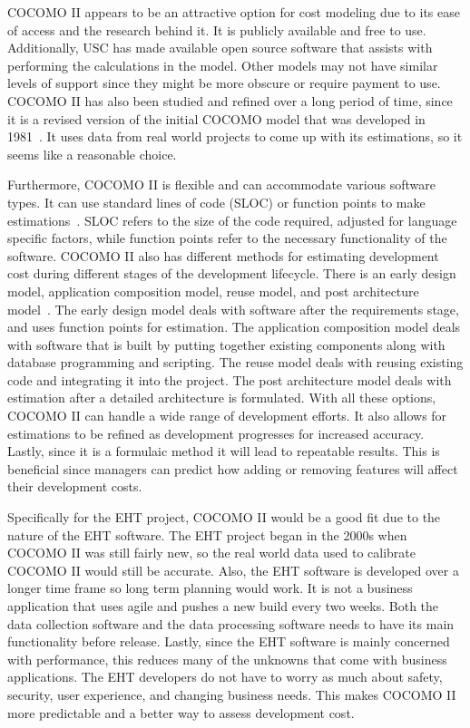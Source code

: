 \documentclass[letterpaper,twocolumn,10pt]{article}
\begin{document}
COCOMO II appears to be an attractive option for cost modeling due to its ease of access and the research behind it. It is publicly
available and free to use. Additionally, USC has made available open source software that assists with performing the calculations in the model.
Other models may not have similar levels of support since they might be more obscure or require payment to use.
COCOMO II has also been studied and refined over a long period of time, since it is a revised version of the initial COCOMO model that was
developed in 1981~\cite{COCOMO}. It uses data from real world projects to come up with its estimations, so it seems like a reasonable choice.

Furthermore, COCOMO II is flexible and can accommodate various software types. It can use standard lines of code (SLOC) or function points
to make estimations~\cite{COCOMO}. SLOC refers to the size of the code required, adjusted for language specific factors, while function points
refer to the necessary functionality of the software. COCOMO II also has different methods for estimating development cost
during different stages of the development lifecycle. There is an early design model, application composition model, reuse model, and post
architecture model~\cite{Sommerville}. The early design model deals with software after the requirements stage, and uses function points for estimation.
The application composition model deals with software that is built by putting together existing components along with database programming and scripting.
The reuse model deals with reusing existing code and integrating it into the project. The post architecture model deals with estimation after a detailed
architecture is formulated. With all these options, COCOMO II can handle a wide range of development efforts. It also allows for estimations to be refined
as development progresses for increased accuracy. Lastly, since it is a formulaic method it will lead to repeatable results. This
is beneficial since managers can predict how adding or removing features will affect their development costs.

Specifically for the EHT project, COCOMO II would be a good fit due to the nature of the EHT software. The EHT project began in the 2000s when COCOMO II
was still fairly new, so the real world data used to calibrate COCOMO II would still be accurate. Also, the EHT software is developed over a longer time
frame so long term planning would work. It is not a business application that uses agile and pushes a new build every two weeks. Both the data collection
software and the data processing software needs to have its main functionality before release. Lastly, since the EHT software is mainly concerned with performance,
this reduces many of the unknowns that come with business applications. The EHT developers do not have to worry as much about safety, security, user experience,
and changing business needs. This makes COCOMO II more predictable and a better way to assess development cost.
\end{document}
